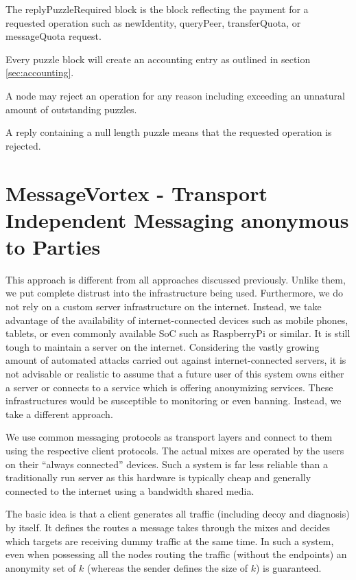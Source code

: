 The replyPuzzleRequired block is the block reflecting the payment for a requested operation such as newIdentity, queryPeer, transferQuota, or messageQuota request.

Every puzzle block will create an accounting entry as outlined in section \ref{sec:accounting}. 

A node may reject an operation for any reason including exceeding an unnatural amount of outstanding puzzles.

A reply containing a null length puzzle means that the requested operation is rejected.

\chapter{MessageVortex - Transport Independent Messaging anonymous to  Parties\label{sec:spec}}
This approach is different from all approaches discussed previously. Unlike them, we put complete distrust into the infrastructure being used. Furthermore, we do not rely on a custom server infrastructure on the internet. Instead, we take advantage of the availability of internet-connected devices such as mobile phones, tablets, or even commonly available SoC such as RaspberryPi or similar. It is still tough to maintain a server on the internet. Considering the vastly growing amount of automated attacks carried out against internet-connected servers, it is not advisable or realistic to assume that a future user of this system owns either a server or connects to a service which is offering anonymizing services. These infrastructures would be susceptible to monitoring or even banning. Instead, we take a different approach.

We use common messaging protocols as transport layers and connect to them using the respective client protocols. The actual mixes are operated by the users on their ``always connected'' devices. Such a system is far less reliable than a traditionally run server as this hardware is typically cheap and generally connected to the internet using a bandwidth shared media.

The basic idea is that a client generates all traffic (including decoy and diagnosis) by itself. It defines the routes a message takes through the mixes and decides which targets are receiving dummy traffic at the same time. In such a system, even when possessing all the nodes routing the traffic (without the endpoints) an anonymity set of $k$ (whereas the sender defines the size of $k$) is guaranteed.

